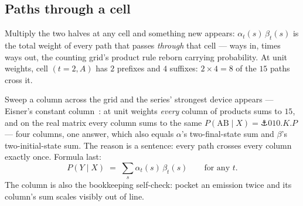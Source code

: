 \begin{narrative}
\section{Paths through a cell}

Multiply the two halves at any cell and something new appears:
$\alpha_t(s)\,\beta_t(s)$ is the total weight of every path that
passes \emph{through} that cell — ways in, times ways out, the
counting grid's product rule reborn carrying probability. At unit
weights, cell $(t{=}2, A)$ has $2$ prefixes and $4$ suffixes:
$2 \times 4 = 8$ of the $15$ paths cross it.

\begin{center}
\end{center}

Sweep a column across the grid and the series' strongest device
appears — Eisner's constant
column~\cite{deep_learning-jason-eisner-the-forward-backward-spreadsheet-acl-02}:
at unit weights \emph{every} column of products sums to $15$, and on
the real matrix every column sums to the same
$P(\mathrm{AB} \mid X) = \anchor{010.K.P}$ — four columns, one
answer, which also equals $\alpha$'s two-final-state sum and
$\beta$'s two-initial-state sum. The reason is a sentence: every
path crosses every column exactly once. Formula last:
\[
  P(Y \mid X) \;=\; \sum_s \alpha_t(s)\,\beta_t(s)
  \qquad \text{for any } t .
\]
The column is also the bookkeeping self-check: pocket an emission
twice and its column's sum scales visibly out of line.


\end{narrative}
